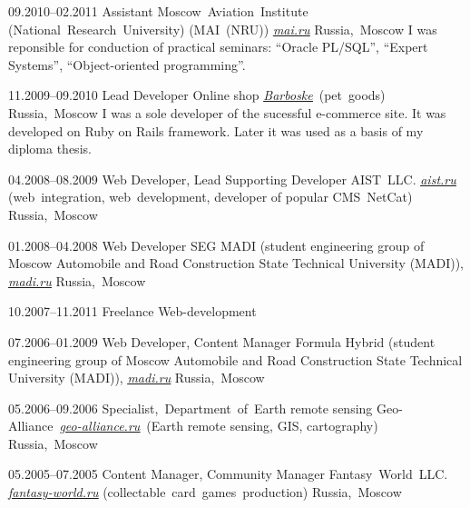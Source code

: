 \documentclass[12pt,a4paper,oneside,final]{moderncv}
\begin{document}
\cventry
{09.2010--02.2011}
{Assistant}
{
  Moscow~Aviation~Institute (National~Research~University) (MAI~(NRU)) \underline{\href{http://mai.ru}{\itshape mai.ru}}
}
{Russia,~Moscow}
{}
{
  I was reponsible for conduction of practical seminars: ``Oracle PL/SQL'', ``Expert Systems'', ``Object-oriented programming''.
}


\cventry
{11.2009--09.2010}
{Lead Developer}
{Online shop \underline{\href{http://barboske.ru}{\itshape Barboske}}~(pet~goods)}
{Russia,~Moscow}
{}
{
  I was a sole developer of the sucessful e-commerce site. It was developed on Ruby on Rails framework. Later it was used as a basis of my diploma thesis.
}


\cventry
{04.2008--08.2009}
{Web Developer, Lead Supporting Developer}
{
  AIST~LLC. \underline{\href{http://aist.ru}{\itshape aist.ru}} (web~integration, web~development, developer of popular CMS~NetCat)
}
{Russia,~Moscow}
{}
{}


\cventry
{01.2008--04.2008}
{Web Developer}
{
  SEG MADI (student engineering group of Moscow Automobile and Road Construction State Technical University (MADI)), \underline{\href{http://madi.ru}{\itshape madi.ru}}
}
{Russia,~Moscow}
{}
{}


\cventry
{10.2007--11.2011}
{Freelance Web-development}{}{}{}{}


\cventry
{07.2006--01.2009}
{Web Developer, Content Manager}
{
  Formula Hybrid (student engineering group of Moscow Automobile and Road Construction State Technical University (MADI)), \underline{\href{http://madi.ru}{\itshape madi.ru}}
}
{Russia,~Moscow}
{}
{}


\cventry
{05.2006--09.2006}
{Specialist,~Department~of~Earth remote sensing}
{
  Geo-Alliance~\underline{\href{http://geo-alliance.ru}{\itshape geo-alliance.ru}}~(Earth remote sensing, GIS, cartography)
}
{Russia,~Moscow}
{}
{}


\cventry
{05.2005--07.2005}
{Content Manager, Community Manager}
{Fantasy~World~LLC. \underline{\href{http://fantasy-world.ru}{\itshape fantasy-world.ru}} (collectable~card~games~production)}
{Russia,~Moscow}
{}
{}
\end{document}
